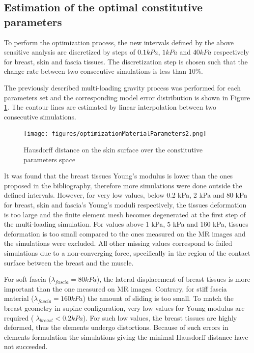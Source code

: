 \subsection{Estimation of the optimal constitutive parameters}
To perform the optimization process, the new intervals defined by the above sensitive analysis are discretized by steps of $0.1 kPa$, $1kPa$ and $40 kPa$ respectively for breast, skin and fascia tissues. The discretization step is chosen such that the change rate between two consecutive simulations is less than 10\%.

The previously described multi-loading gravity process was performed for each parameters set and the corresponding model error distribution is shown in  Figure \ref{fig:optimizationresults}. The contour lines are estimated by linear interpolation between two consecutive simulations.

\begin{figure}[!h]
\centering
\texttt{[image: figures/optimizationMaterialParameters2.png]} 
\caption{Hausdorff distance on the skin surface over the constitutive parameters space}\label{fig:optimizationresults}
\end{figure}

It was found that the breast tissues Young's modulus is lower than the ones proposed in the bibliography, therefore more simulations were done outside the defined intervals. However, for very low values, below 0.2 kPa, 2 kPa and 80 kPa for breast, skin and fascia's Young's moduli respectively, the tissues deformation is too large and the finite element mesh becomes degenerated at the first step of the multi-loading simulation. For values above 1 kPa, 5 kPa and 160 kPa, tissues deformation is too small compared to the ones measured on the MR images and the simulations were excluded. All other missing values correspond to failed simulations due to a non-converging force, specifically in the region of the contact surface between the breast and the muscle.


 

For soft fascia ($\lambda_{fascia} = 80kPa$), the lateral displacement of breast tissues is more important than the one measured on MR images. Contrary, for stiff fascia material ($\lambda_{fascia}=160 kPa$) the amount of sliding is too small. To match the breast geometry in supine configuration, very low values for Young modulus are required ( $\lambda_{breast}< 0.2kPa$). For such low values, the breast tissues are highly deformed, thus the elements undergo distortions. Because of such errors in elements formulation the simulations giving the minimal Hausdorff distance have not succeeded.   

